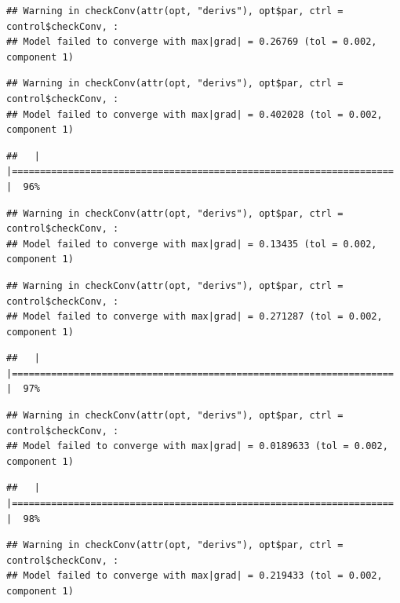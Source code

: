 \documentclass[
  12pt,
]{book}
\begin{document}
\begin{verbatim}
## Warning in checkConv(attr(opt, "derivs"), opt$par, ctrl = control$checkConv, :
## Model failed to converge with max|grad| = 0.26769 (tol = 0.002, component 1)
\end{verbatim}

\begin{verbatim}
## Warning in checkConv(attr(opt, "derivs"), opt$par, ctrl = control$checkConv, :
## Model failed to converge with max|grad| = 0.402028 (tol = 0.002, component 1)
\end{verbatim}

\begin{verbatim}
##   |                                                                              |====================================================================  |  96%
\end{verbatim}

\begin{verbatim}
## Warning in checkConv(attr(opt, "derivs"), opt$par, ctrl = control$checkConv, :
## Model failed to converge with max|grad| = 0.13435 (tol = 0.002, component 1)
\end{verbatim}

\begin{verbatim}
## Warning in checkConv(attr(opt, "derivs"), opt$par, ctrl = control$checkConv, :
## Model failed to converge with max|grad| = 0.271287 (tol = 0.002, component 1)
\end{verbatim}

\begin{verbatim}
##   |                                                                              |====================================================================  |  97%
\end{verbatim}

\begin{verbatim}
## Warning in checkConv(attr(opt, "derivs"), opt$par, ctrl = control$checkConv, :
## Model failed to converge with max|grad| = 0.0189633 (tol = 0.002, component 1)
\end{verbatim}

\begin{verbatim}
##   |                                                                              |====================================================================  |  98%
\end{verbatim}

\begin{verbatim}
## Warning in checkConv(attr(opt, "derivs"), opt$par, ctrl = control$checkConv, :
## Model failed to converge with max|grad| = 0.219433 (tol = 0.002, component 1)
\end{verbatim}
\end{document}
